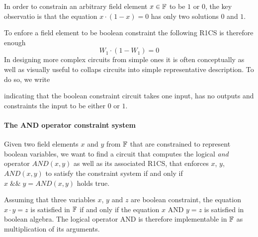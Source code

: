 In order to constrain an arbitrary field element $x\in \mathbb{F}$ to be $1$ or $0$, the key observatio is that the equation $x \cdot (1-x) =0$ has only two solutions $0$ and $1$.
\begin{center}
\end{center}
To enfore a field element to be boolean constraint the following R1CS is therefore enough
\begin{equation}
W_1 \cdot (1-W_1) =0
\end{equation}
In designing more complex circuits from simple ones it is often conceptually as well as visually useful to collaps circuits into simple representative description. To do so, we write 
\begin{center}
\end{center}
indicating that the boolean constraint circuit takes one input, has no outputs and constraints the input to be either $0$ or $1$.
\paragraph{The AND operator constraint system} Given two field elements $x$ and $y$ from $\mathbb{F}$ that are constrained to represent boolean variables, we want to find a circuit that computes the logical \textit{and} operator $AND(x,y)$ as well as its associated R1CS, that enforces $x$, $y$, $AND(x,y)$ to satisfy the constraint system if and only if $x\; \&\& \; y =AND(x,y)$ holds true. 

Assuming that three variables $x$, $y$ and $z$ are boolean constraint, the equation $x\cdot y = z$ is satisfied in $\mathbb{F}$ if and only if the equation $x\text{ AND }y = z$ is satisfied in boolean algebra. The logical operator AND is therefore implementable in $\mathbb{F}$ as multiplication of its arguments. 

